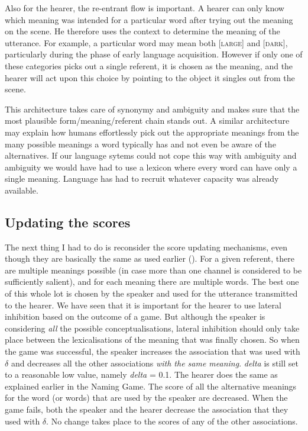 Also for the hearer, the re-entrant flow is important. 
A hearer can only know which meaning was intended for a particular
word after trying out the meaning on the scene. He
therefore uses the context to determine the meaning of 
the utterance. For example, a particular word may mean both [\textsc{large}]
and [\textsc{dark}], particularly during the phase of 
early language acquisition. However if only one of these categories
picks out a single referent, it is chosen as 
the meaning, and the hearer will act upon this choice by 
pointing to the object it singles out from the scene. 

This architecture takes care of synonymy and ambiguity and
makes sure that the most plausible form/meaning/referent
chain stands out. A similar architecture may explain how
humans effortlessly pick out the appropriate meanings from 
the many possible meanings a word typically has and not even 
be aware of the alternatives. If our language sytems 
could not cope this way with ambiguity and ambiguity we 
would have had to use a lexicon where every word can 
have only a single meaning. Language has had to 
recruit whatever capacity was already available. 

\subsection{Updating the scores}

The next thing I had to do is reconsider the score
updating mechanisms, even though they are basically 
the same as used earlier (). 
For a given referent, there are multiple meanings possible
(in case more than one channel is considered to 
be sufficiently salient), and
for each meaning there are multiple words. The best 
one of this whole lot is chosen by the speaker and used
for the utterance transmitted to the hearer. We have 
seen that it is important for the hearer to use lateral
inhibition based on the outcome of a game. But although 
the speaker is considering {\itshape all} the possible 
conceptualisations, lateral
inhibition should only take place between the 
lexicalisations of the meaning that was finally chosen. 
So when the game was successful, 
the speaker increases the association that was used with $\delta$
and decreases all the other associations
{\itshape with the same meaning}. \emph{delta} is still set to a reasonable
low value, namely \emph{delta} = 0.1. 
The hearer does the same as explained earlier in 
the Naming Game. The score of all
the alternative meanings for the word (or words) 
that are used by the speaker are decreased. 
When the game fails, both the speaker and the hearer 
decrease the association that they used with $\delta$. No
change takes place to the scores of any of the 
other associations. 


